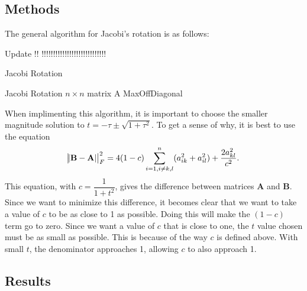 \documentclass[11pt]{article}
\begin{document}
\subsection{Methods}


        The general algorithm for Jacobi's rotation is as follows:

         Update !! !!!!!!!!!!!!!!!!!!!!!!!!!!!!
        \begin{algorithm}[H]
        \caption{Jacobi Rotation}
        \label{Jacobi Rotation}
        \begin{algorithmic}[1]
        \Procedure Jacobi Rotation
        \State $n \times n$ matrix A
        \Function MaxOffDiagonal
        \EndFunction
        \EndProcedure
        \end{algorithmic}
        \end{algorithm}

        When implimenting this algorithm, it is important to choose the smaller magnitude solution to $t = -\tau \pm \sqrt{1+\tau^2}$. To get a sense of why, it is best to use the equation
        \[ \abs{\abs{\mathbf{B} - \mathbf{A}}}_F^2 = 4 (1-c) \sum_{i=1,i\neq k,l}^n (a_{ik}^2 + a_{il}^2) + \dfrac{2a_{kl}^2}{c^2}. \] 
        This equation, with $c=\dfrac{1}{1+t^2}$, gives the difference between matrices $\mathbf{A}$ and $\mathbf{B}$. Since we want to minimize this difference, it becomes clear that we want to take a value of $c$ to be as close to 1 as possible. Doing this will make the $(1-c)$ term go to zero. Since we want a value of $c$ that is close to one, the $t$ value chosen must be as small as possible. This is because of the way $c$ is defined above. With small $t$, the denominator approaches 1, allowing $c$ to also approach 1.


\subsection{Results}

\end{document}

